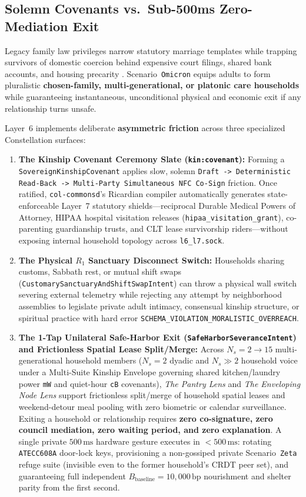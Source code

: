 \subsection{Solemn Covenants vs.\ Sub-500ms Zero-Mediation Exit}

Legacy family law privileges narrow statutory marriage templates while trapping survivors of domestic coercion behind expensive court filings, shared bank accounts, and housing precarity \parencite{hirschman1970}. Scenario~\texttt{Omicron} equips adults to form pluralistic \textbf{chosen-family, multi-generational, or platonic care households} while guaranteeing instantaneous, unconditional physical and economic exit if any relationship turns unsafe.

Layer~6 implements deliberate \textbf{asymmetric friction} across three specialized Constellation surfaces:
\begin{enumerate}
    \item \textbf{The Kinship Covenant Ceremony Slate (\texttt{kin:covenant}):} Forming a \texttt{SovereignKinshipCovenant} applies slow, solemn \texttt{Draft -> Deterministic Read-Back -> Multi-Party Simultaneous NFC Co-Sign} friction. Once ratified, \texttt{col-commonsd}'s Ricardian compiler automatically generates state-enforceable Layer~7 statutory shields---reciprocal Durable Medical Powers of Attorney, HIPAA hospital visitation releases (\texttt{hipaa\_visitation\_grant}), co-parenting guardianship trusts, and CLT lease survivorship riders---without exposing internal household topology across \texttt{l6\_l7.sock}.
    \item \textbf{The Physical $R_1$ Sanctuary Disconnect Switch:} Households sharing customs, Sabbath rest, or mutual shift swaps (\texttt{CustomarySanctuaryAndShiftSwapIntent}) can throw a physical wall switch severing external telemetry while rejecting any attempt by neighborhood assemblies to legislate private adult intimacy, consensual kinship structure, or spiritual practice with hard error \texttt{SCHEMA\_VIOLATION\_MORALISTIC\_OVERREACH}.
    \item \textbf{The 1-Tap Unilateral Safe-Harbor Exit (\texttt{SafeHarborSeveranceIntent}) and Frictionless Spatial Lease Split/Merge:} Across $N_s = 2 \to 15$ multi-generational household members ($N_s=2$ dyadic and $N_s \gg 2$ household voice under a Multi-Suite Kinship Envelope governing shared kitchen/laundry power \texttt{mW} and quiet-hour \texttt{cB} covenants), \textit{The Pantry Lens} and \textit{The Enveloping Node Lens} support frictionless split/merge of household spatial leases and weekend-detour meal pooling with zero biometric or calendar surveillance. Exiting a household or relationship requires \textbf{zero co-signature, zero council mediation, zero waiting period, and zero explanation}. A single private $500\,\mathrm{ms}$ hardware gesture executes in $< 500\,\mathrm{ms}$: rotating \texttt{ATECC608A} door-lock keys, provisioning a non-gossiped private Scenario~\texttt{Zeta} refuge suite (invisible even to the former household's CRDT peer set), and guaranteeing full independent $B_{\mathrm{baseline}} = 10{,}000\,\mathrm{bp}$ nourishment and shelter parity from the first second.
\end{enumerate}

